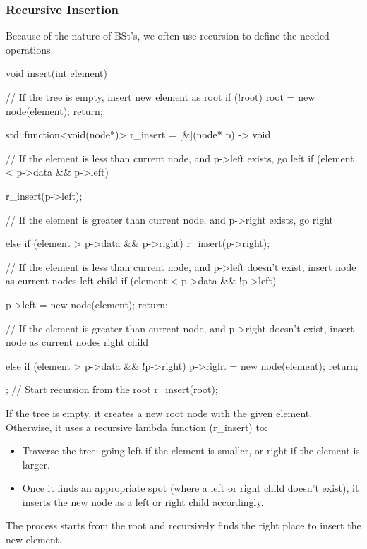 \documentclass{report}
\begin{document}
\pagebreak 
\subsubsection{Recursive Insertion}
\bigbreak \noindent 
Because of the nature of  BSt's, we often use recursion to define the needed operations.
\bigbreak \noindent 
\begin{cppcode}
    void insert(int element)  {
        // If the tree is empty, insert new element as root
        if (!root) {
            root = new node(element);
            return;
        }

        std::function<void(node*)> r_insert = [&](node* p) -> void {

            // If the element is less than current node, and p->left exists, go left
            if (element < p->data && p->left) {
                r_insert(p->left);

                // If the element is greater than current node, and p->right exists, go right
            } else if (element > p->data && p->right) {
                r_insert(p->right);
            }

            // If the element is less than current node, and p->left doesn't exist, insert node as current nodes left child
            if (element < p->data && !p->left) {
                p->left = new node(element);
                return;

                // If the element is greater than current node, and p->right doesn't exist, insert node as current nodes right child
            } else if (element > p->data && !p->right) {
                p->right = new node(element);
                return;
            }
        };
        // Start recursion from the root
        r_insert(root);
    }
\end{cppcode}
\bigbreak \noindent 
If the tree is empty, it creates a new root node with the given element.
\bigbreak \noindent 
Otherwise, it uses a recursive lambda function (r\_insert) to:
\begin{itemize}
    \item Traverse the tree: going left if the element is smaller, or right if the element is larger.
    \item Once it finds an appropriate spot (where a left or right child doesn't exist), it inserts the new node as a left or right child accordingly.
\end{itemize}
The process starts from the root and recursively finds the right place to insert the new element.
\end{document}
